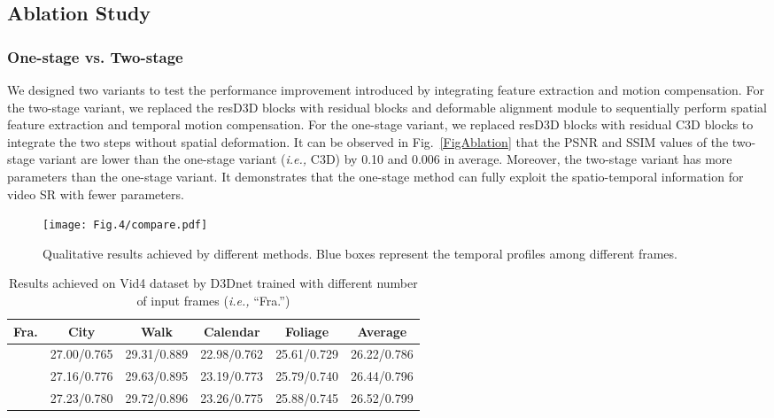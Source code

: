 \documentclass[journal]{IEEEtran}
\begin{document}
\subsection{Ablation Study}\label{ablation}

\subsubsection{One-stage vs. Two-stage}\label{fine-tune}
We designed two variants to test the performance improvement introduced by integrating feature extraction and motion compensation. For the two-stage variant, we replaced the resD3D blocks with  residual blocks and deformable alignment module \cite{TDAN} to sequentially perform spatial feature extraction and temporal motion compensation. For the one-stage variant, we replaced resD3D blocks with  residual C3D blocks to integrate the two steps without spatial deformation. It can be observed in Fig.~\ref{FigAblation} that the PSNR and SSIM values of the two-stage variant are lower than the one-stage variant (\textit{i.e.,} C3D) by 0.10 and 0.006 in average. Moreover, the two-stage variant has more parameters than the one-stage variant. It demonstrates that the one-stage method can fully exploit the spatio-temporal information for video SR with fewer parameters.

\begin{figure*}[t]
\centering
\vspace{-.1in}
\texttt{[image: Fig.4/compare.pdf]}
\caption{Qualitative results achieved by different methods. Blue boxes represent the temporal profiles among different frames.}\label{visual}
\vspace{0.2cm}
\end{figure*}

\begin{table}
\footnotesize
\centering
\renewcommand\arraystretch{1.5}
\caption{Results achieved on Vid4 \cite{VESPCN} dataset by D3Dnet trained with different number of input frames (\textit{i.e.,} ``Fra.'')}\label{Frames}
\scriptsize
\begin{tabular}{c|cccc|c}
\hline
Fra. & City&Walk&Calendar &Foliage  &Average\\
\hline
&27.00/0.765&29.31/0.889&22.98/0.762& 25.61/0.729 &26.22/0.786\\
&27.16/0.776&29.63/0.895&23.19/0.773& 25.79/0.740 &26.44/0.796\\
&27.23/0.780&29.72/0.896&23.26/0.775& 25.88/0.745 &26.52/0.799\\
\hline
\end{tabular}\label{InputFrame}
\end{table}
\end{document}

